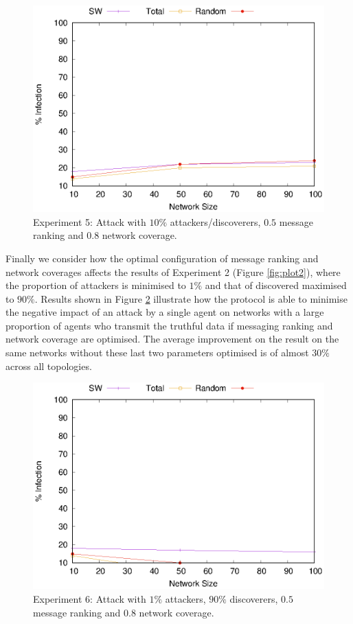 \documentclass[compsoc, conference, letterpaper, 10pt, times]{IEEEtran}
\begin{document}
\begin{figure}
\includegraphics[scale=0.70]{5thconfig}
\caption{Experiment 5: Attack with $10\%$ attackers/discoverers, $0.5$ message ranking and $0.8$ network coverage.}\label{fig:plot5}
\end{figure}
Finally we consider how the optimal configuration of message ranking and network coverages affects the results of Experiment 2 (Figure \ref{fig:plot2}), where the proportion of attackers is minimised to $1\%$ and that of discovered maximised to $90\%$. Results shown in Figure \ref{fig:plot6} illustrate how the protocol is able to minimise the negative impact of an attack by a single agent on networks with a large proportion of agents who transmit the truthful data if messaging ranking and network coverage are optimised. The average improvement on the result on the same networks without these last two parameters optimised is of almost $30\%$ across all topologies.

\begin{figure}
\includegraphics[scale=0.70]{5thconfig_1_90}
\caption{Experiment 6: Attack with $1\%$ attackers, $90\%$ discoverers, $0.5$ message ranking and $0.8$ network coverage.}\label{fig:plot6}
\end{figure}
\end{document}
